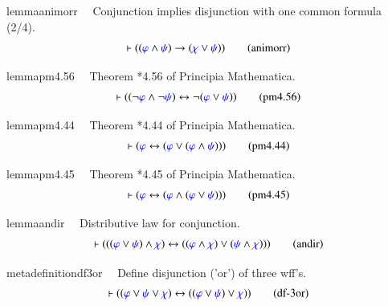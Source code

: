 \begin{restatable}{lemma}{animorr}~~ Conjunction implies disjunction with one
common formula (2/4).
     ~
\begin{align}
\vdash ( ( \mw{\varphi} \wedge \mw{\psi} ) \rightarrow ( \mw{\chi} \vee
    \mw{\psi} ) )\label{eq:animorr}\tag{animorr}
\end{align}
\end{restatable}

\begin{restatable}{lemma}{pm4.56}~~ Theorem *4.56 of Principia Mathematica. 
~
\begin{align}
\vdash ( ( \lnot \mw{\varphi} \wedge \lnot \mw{\psi} ) \leftrightarrow \lnot (
    \mw{\varphi} \vee \mw{\psi} ) )\label{eq:pm4.56}\tag{pm4.56}
\end{align}
\end{restatable}

\begin{restatable}{lemma}{pm4.44}~~ Theorem *4.44 of Principia Mathematica. 
~
\begin{align}
\vdash ( \mw{\varphi} \leftrightarrow ( \mw{\varphi} \vee ( \mw{\varphi} \wedge
    \mw{\psi} ) ) )\label{eq:pm4.44}\tag{pm4.44}
\end{align}
\end{restatable}

\begin{restatable}{lemma}{pm4.45}~~ Theorem *4.45 of Principia Mathematica. 
~
\begin{align}
\vdash ( \mw{\varphi} \leftrightarrow ( \mw{\varphi} \wedge ( \mw{\varphi} \vee
    \mw{\psi} ) ) )\label{eq:pm4.45}\tag{pm4.45}
\end{align}
\end{restatable}

\begin{restatable}{lemma}{andir}~~ Distributive law for conjunction. 
~
\begin{align}
\vdash ( ( ( \mw{\varphi} \vee \mw{\psi} ) \wedge \mw{\chi} ) \leftrightarrow (
    ( \mw{\varphi} \wedge \mw{\chi} ) \vee ( \mw{\psi} \wedge \mw{\chi} ) )
    )\label{eq:andir}\tag{andir}
\end{align}
\end{restatable}

\begin{restatable}{metadefinition}{df3or}~~ Define disjunction ('or') of three wff's.
\begin{align}
\vdash ( ( \mw{\varphi} \vee \mw{\psi} \vee \mw{\chi} ) \leftrightarrow ( (
    \mw{\varphi} \vee \mw{\psi} ) \vee \mw{\chi} )
    )\label{eq:df-3or}\tag{df-3or}
\end{align}
\end{restatable}


